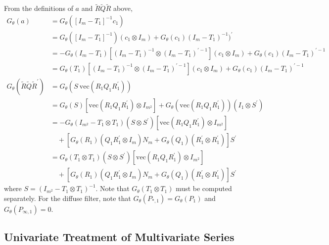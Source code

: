 \documentclass[12pt]{article}
\newcommand{\Gt}{G_\theta}
\newcommand{\vecop}[0]{\text{vec}}
\begin{document}
	From the definitions of $a$ and $\tilde{R} \tilde{Q} \tilde{R}$ above, 
	\begin{align*}
	\Gt(a) &= \Gt([I_m - T_1]^{-1} c_1) \\ 
		&= \Gt([I_m - T_1]^{-1}) (c_1 \otimes I_m) + \Gt(c_1) (I_m - T_1)^{-1})^\prime \\ 
		&= -\Gt(I_m - T_1) [(I_m - T_1)^{-1} \otimes (I_m - T_1)^{\prime-1} ](c_1 \otimes I_m) +  \Gt(c_1) (I_m - T_1)^{\prime-1} \\ 
		&= \Gt(T_1) [(I_m - T_1)^{-1} \otimes (I_m - T_1)^{\prime-1}] (c_1 \otimes I_m) +  \Gt(c_1) (I_m - T_1)^{\prime-1} \\
	\Gt(\tilde{R} \tilde{Q} \tilde{R}^\prime) &= \Gt(S \ \vecop(R_1 Q_1 R_1^\prime))\\
		&= \Gt(S) [\vecop(R_1 Q_1 R_1^\prime) \otimes I_{m^2}] + \Gt(\vecop(R_1 Q_1 R_1^\prime))(I_1 \otimes S^\prime) \\
		&= -\Gt(I_{m^2} - T_1 \otimes T_1)(S \otimes S^\prime) [\vecop(R_1 Q_1 R_1^\prime) \otimes I_{m^2}]\\ 
		&\quad + [\Gt(R_1)(Q_1 R_1^\prime \otimes I_m) N_m + \Gt(Q_1)(R_1^\prime \otimes R_1^\prime)] S^\prime \\
		&= \Gt(T_1 \otimes T_1)(S \otimes S^\prime) [\vecop(R_1 Q_1 R_1^\prime) \otimes I_{m^2}] \\
		&\quad + [\Gt(R_1)(Q_1 R_1^\prime \otimes I_m) N_m + \Gt(Q_1)(R_1^\prime \otimes R_1^\prime)] S^\prime
	\end{align*}
	where $S = (I_{m^2} - T_1 \otimes T_1)^{-1}$. Note that $\Gt(T_1 \otimes T_1)$ must be computed separately. For the diffuse filter, note that $\Gt(P_{*,1}) = \Gt(P_1)$ and $\Gt(P_{\infty,1}) = 0$.

\subsection*{Univariate Treatment of Multivariate Series}
\end{document}
